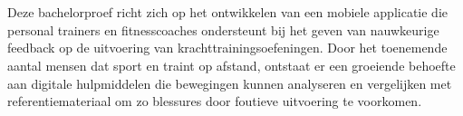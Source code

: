 
%
%
%
%
%

%



\chapter*{}

Deze bachelorproef richt zich op het ontwikkelen van een mobiele applicatie die personal trainers en fitnesscoaches ondersteunt bij het geven van nauwkeurige feedback op de uitvoering van krachttrainingsoefeningen. 
Door het toenemende aantal mensen dat sport en traint op afstand, ontstaat er een groeiende behoefte aan digitale hulpmiddelen die bewegingen kunnen analyseren en vergelijken met referentiemateriaal om zo blessures door foutieve uitvoering te voorkomen.

